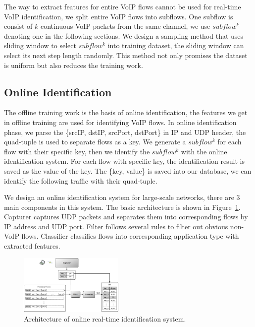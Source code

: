 \documentclass[conference]{IEEEtran}
\begin{document}
The way to extract features for entire VoIP flows cannot be used for real-time VoIP identification, we split entire VoIP flows into subflows. One subflow is consist of $k$ continuous VoIP packets from the same channel, we use $subflow^k$ denoting one in the following sections. We design a sampling method that uses sliding window to select $subflow^k$ into training dataset, the sliding window can select its next step length randomly. This method not only promises the dataset is uniform but also reduces the training work.



\subsection{Online Identification}
\label{sec:onlineidentification}
The offline training work is the basis of online identification, the features we get in offline training are used for identifying VoIP flows. In online identification phase, we parse the \{srcIP, dstIP, srcPort, dstPort\} in IP and UDP header, the quad-tuple is used to separate flows as a key. We generate a $subflow^k$ for each flow with their specific key, then we identify the $subflow^k$ with the online identification system. For each flow with specific key, the identification result is saved as the value of the key. The \{key, value\} is saved into our database, we can identify the following traffic with their quad-tuple.

We design an online identification system for large-scale networks, there are 3 main components in this system. The basic architecture is shown in Figure~\ref{fig:online_architecture_new}. Capturer captures UDP packets and separates them into corresponding flows by IP address and UDP port. Filter follows several rules to filter out obvious non-VoIP flows. Classifier classifies flows into corresponding application type with extracted features.
\begin{figure}[htp]
\begin{center}
\includegraphics[width=0.45\textwidth]{online_architecture_new.eps}
\caption{Architecture of online real-time identification system.}\label{fig:online_architecture_new}
\end{center}
\end{figure}
\end{document}
